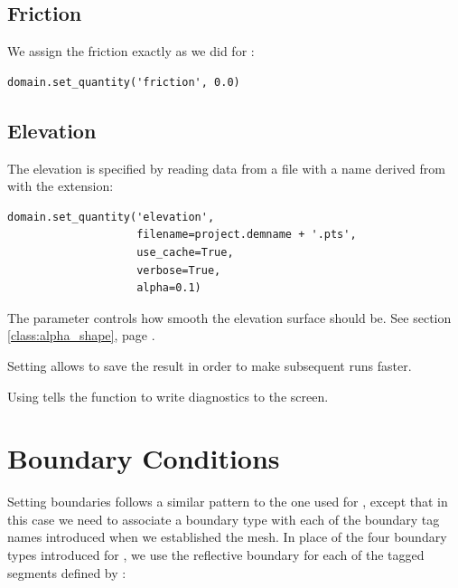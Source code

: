 \documentclass{manual}
\begin{document}
\subsection{Friction}

We assign the friction exactly as we did for :

\begin{verbatim}
domain.set_quantity('friction', 0.0)
\end{verbatim}

\subsection{Elevation}

The elevation is specified by reading data from a file with a name derived from
 with the  extension:

\begin{verbatim}
domain.set_quantity('elevation',
                    filename=project.demname + '.pts',
                    use_cache=True,
                    verbose=True,
                    alpha=0.1)
\end{verbatim}

The  parameter controls how smooth the elevation surface
should be.  See section \ref{class:alpha_shape}, page \pageref{class:alpha_shape}.

Setting  allows \anuga to save the result in order
to make subsequent runs faster.

Using  tells the function to write diagnostics to
the screen.

\section{Boundary Conditions}

Setting boundaries follows a similar pattern to the one used for
, except that in this case we need to associate a
boundary type with each of the
boundary tag names introduced when we established the mesh. In place of the four
boundary types introduced for , we use the reflective
boundary for each of the tagged segments defined by :
\end{document}
